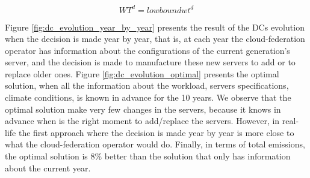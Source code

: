 \begin{equation} \label{eq:low_bound_wt}
WT^d = lowboundwt^d
\end{equation}


Figure \ref{fig:dc_evolution_year_by_year} presents the result of the DCs evolution when the decision is made year by year, that is, at each year the cloud-federation operator has information about the configurations of the current generation's server, and the decision is made to manufacture these new servers to add or to replace older ones. Figure \ref{fig:dc_evolution_optimal} presents the optimal solution, when all the information about the workload, servers specifications, climate conditions, is known in advance for the 10 years. We observe that the optimal solution make very few changes in the servers, because it knows in advance when is the right moment to add/replace the servers. However, in real-life the first approach where the decision is made year by year is more close to what the cloud-federation operator would do. Finally, in terms of total  emissions, the optimal solution is 8\% better than the solution that only has information about the current year.




